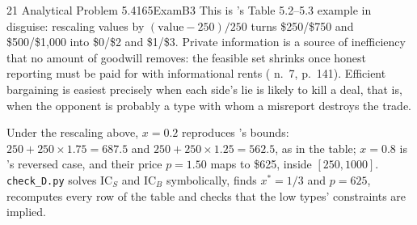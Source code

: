 \begin{exsol}{21}{\MR{} Analytical Problem 5.4}{165}{Exam}{B3}
\interp This is \MR's Table 5.2--5.3 example in disguise: rescaling values by
$(\text{value} - 250)/250$ turns \$250/\$750 and \$500/\$1{,}000 into \$0/\$2 and \$1/\$3. Private
information is a source of inefficiency that no amount of goodwill removes: the feasible set
shrinks once honest reporting must be paid for with informational rents (\MR{} n.~7, p.~141).
Efficient bargaining is easiest precisely when each side's lie is likely to kill a deal, that is,
when the opponent is probably a type with whom a misreport destroys the trade.

\verify Under the rescaling above, $x = 0.2$ reproduces \MR's bounds: $250 + 250 \times 1.75 =
687.5$ and $250 + 250 \times 1.25 = 562.5$, as in the table; $x = 0.8$ is \MR's reversed case,
and their price $p = 1.50$ maps to \$625, inside $[250, 1000]$. \texttt{check\_D.py} solves
IC$_S$ and IC$_B$ symbolically, finds $x^* = 1/3$ and $p = 625$, recomputes every row of the
table and checks that the low types' constraints are implied.

\end{exsol}
